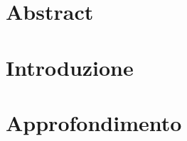 \documentclass[a4paper,12pt,oneside]{report}
\begin{document}
	
	\begin{titlepage}
    
    \end{titlepage}

  
    
    
    
    \chapter*{Abstract}
    
    
    \newpage  
    
    \tableofcontents{}
    
    \chapter{Introduzione}
    
    
    \chapter{Approfondimento}
    
    

    
     
    
   
    
\end{document}
